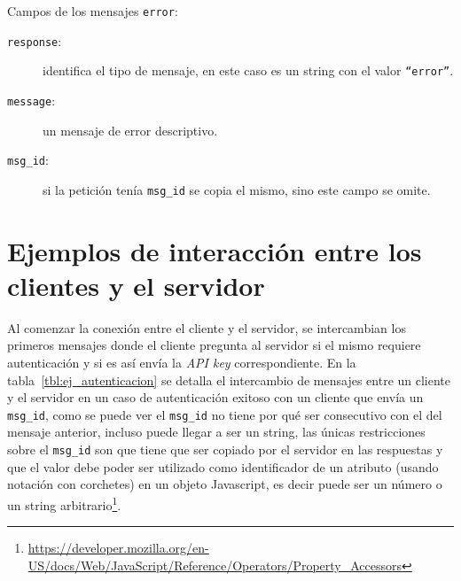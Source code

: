 Campos de los mensajes \texttt{error}:
\begin{description}
    \item[\texttt{response}:] identifica el tipo de mensaje, en este caso
        es un string con el valor \texttt{``error''}.
    \item[\texttt{message}:] un mensaje de error descriptivo.
    \item[\texttt{msg\_id}:] si la petición tenía \texttt{msg\_id} se
        copia el mismo, sino este campo se omite.
\end{description}


\section{Ejemplos de interacción entre los clientes y el servidor}

Al comenzar la conexión entre el cliente y el servidor, se intercambian
los primeros mensajes donde el cliente pregunta al servidor si el
mismo requiere autenticación y si es así envía la \textit{API key}
correspondiente. En la tabla~\ref{tbl:ej_autenticacion} se detalla
el intercambio de mensajes entre un cliente y el servidor en un
caso de autenticación exitoso con un cliente que envía un \texttt{msg\_id},
como se puede ver el \texttt{msg\_id}
no tiene por qué ser consecutivo con el del mensaje anterior, incluso
puede llegar a ser un string, las únicas restricciones sobre el
\texttt{msg\_id} son que tiene que ser copiado por el servidor
en las respuestas y que el valor debe poder ser utilizado como
identificador de un atributo (usando notación con corchetes) en un
objeto Javascript, es decir puede ser un número o un string
arbitrario\footnote{\url{https://developer.mozilla.org/en-US/docs/Web/JavaScript/Reference/Operators/Property\_Accessors}}.

